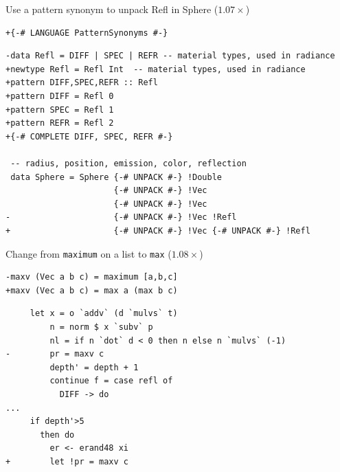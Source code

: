 \documentclass[8pt]{beamer}
\begin{document}
\begin{frame}[fragile]{Use a pattern synonym to unpack Refl in Sphere ($1.07\times$)}

\begin{verbatim}
+{-# LANGUAGE PatternSynonyms #-}
\end{verbatim}


\begin{verbatim}
-data Refl = DIFF | SPEC | REFR -- material types, used in radiance
+newtype Refl = Refl Int  -- material types, used in radiance
+pattern DIFF,SPEC,REFR :: Refl
+pattern DIFF = Refl 0
+pattern SPEC = Refl 1
+pattern REFR = Refl 2
+{-# COMPLETE DIFF, SPEC, REFR #-}

 -- radius, position, emission, color, reflection
 data Sphere = Sphere {-# UNPACK #-} !Double 
                      {-# UNPACK #-} !Vec
                      {-# UNPACK #-} !Vec 
-                     {-# UNPACK #-} !Vec !Refl
+                     {-# UNPACK #-} !Vec {-# UNPACK #-} !Refl

 \end{verbatim}



\end{frame}

\begin{frame}[fragile]{Change from \texttt{maximum} on a list to \texttt{max} ($1.08\times$)}
\begin{verbatim}
-maxv (Vec a b c) = maximum [a,b,c]
+maxv (Vec a b c) = max a (max b c)
\end{verbatim}

\begin{verbatim}
     let x = o `addv` (d `mulvs` t)
         n = norm $ x `subv` p
         nl = if n `dot` d < 0 then n else n `mulvs` (-1)
-        pr = maxv c
         depth' = depth + 1
         continue f = case refl of
           DIFF -> do
...
     if depth'>5
       then do
         er <- erand48 xi
+        let !pr = maxv c
\end{verbatim}

\end{frame}
\end{document}
